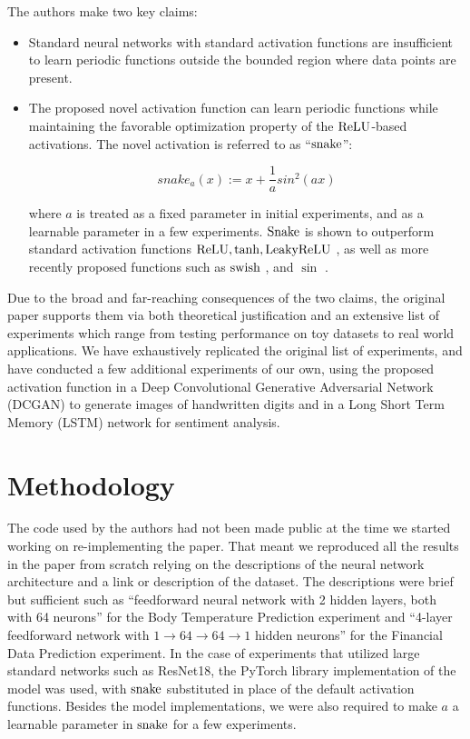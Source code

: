 The authors make two key claims:
\begin{itemize}[leftmargin=*]
    \item Standard neural networks with standard activation functions are insufficient to learn periodic functions outside the bounded region where data points are present.
    \item The proposed novel activation function can learn periodic functions while maintaining the favorable optimization property of the $ \operatorname{ReLU} $-based activations. The novel activation is referred to as ``$ \operatorname{snake} $'':

     \[ snake_{a}(x) := x + \frac{1}{a}sin^{2}(a x) \]
     
     where $a$ is treated as a fixed parameter in initial experiments, and as a learnable parameter in a few experiments. $ \operatorname{Snake} $ is shown to outperform standard activation functions $ \operatorname{ReLU}, \tanh, \operatorname{LeakyReLU} $ \cite{DBLP:conf/icml/NairH10}, as well as more recently proposed functions such as $ \operatorname{swish} $ \cite{Ramachandran2017SwishAS}, and $ \sin $ \cite{sitzmann2020implicit, Parascandolo2017TamingTW}.
\end{itemize}

Due to the broad and far-reaching consequences of the two claims, the original paper supports them via both theoretical justification and an extensive list of experiments which range from testing performance on toy datasets to real world applications. We have exhaustively replicated the original list of experiments, and have conducted a few additional experiments of our own, using the proposed activation function in a Deep Convolutional Generative Adversarial Network (DCGAN) to generate images of handwritten digits and in a Long Short Term Memory (LSTM) network for sentiment analysis.

\section{Methodology}

The code used by the authors had not been made public at the time we started working on re-implementing the paper. That meant we reproduced all the results in the paper from scratch relying on the descriptions of the neural network architecture and a link or description of the dataset.
The descriptions were brief but sufficient such as ``feedforward neural network with 2 hidden layers, both with 64 neurons'' for the Body Temperature Prediction experiment and ``4-layer feedforward network with $ 1 \rightarrow 64 \rightarrow 64 \rightarrow 1 $ hidden neurons'' for the Financial Data Prediction experiment. 
In the case of experiments that utilized large standard networks such as ResNet18, the PyTorch library implementation of the model was used, with $\operatorname{snake}$ substituted in place of the default activation functions.
Besides the model implementations, we were also required to make $a$ a learnable parameter in $ \operatorname{snake} $ for a few experiments.

